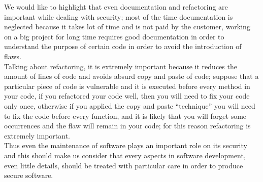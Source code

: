 We would like to highlight that even documentation and refactoring are important while dealing with security; most of the time documentation is neglected because it takes lot of time and is not paid by the customer, working on a big project for long time
requires good documentation in order to understand the purpose of certain code in order to avoid the introduction of flaws.\\
Talking about refactoring, it is extremely important because it reduces the amount of lines of code and
avoids absurd copy and paste of code; suppose that a particular piece of code is vulnerable and it is executed
before every method in your code, if you refactored your code well, then you will need to fix your code only once, otherwise
if you applied the copy and paste ``technique'' you will need to fix the code before every function, and it is likely that you will forget some occurrences and the flaw will remain in your code; for this reason refactoring is extremely important.\\
Thus even the maintenance of software plays an important role on its security and this should make us consider that every
aspects in software development, even little details, should be treated with particular care in order to produce secure software.